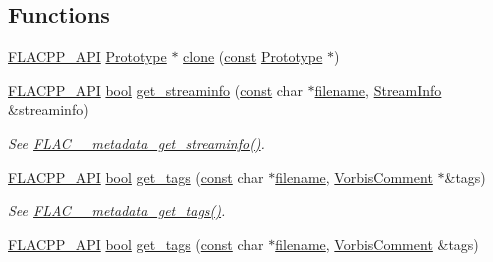 \subsection*{Functions}
\begin{DoxyCompactItemize}
\item 
\hyperlink{group__flacpp__export_gaec3a801bf18630403eda6dc2f8c4927a}{F\+L\+A\+C\+P\+P\+\_\+\+A\+PI} \hyperlink{class_f_l_a_c_1_1_metadata_1_1_prototype}{Prototype} $\ast$ \hyperlink{group__flacpp__metadata__object_gaea2484b59c72f4cce8366f25133f5d51}{clone} (\hyperlink{getopt1_8c_a2c212835823e3c54a8ab6d95c652660e}{const} \hyperlink{class_f_l_a_c_1_1_metadata_1_1_prototype}{Prototype} $\ast$)
\item 
\hyperlink{group__flacpp__export_gaec3a801bf18630403eda6dc2f8c4927a}{F\+L\+A\+C\+P\+P\+\_\+\+A\+PI} \hyperlink{mac_2config_2i386_2lib-src_2libsoxr_2soxr-config_8h_abb452686968e48b67397da5f97445f5b}{bool} \hyperlink{group__flacpp__metadata__level0_ga7dd10e98bdacabcff282c5bf3b29a34a}{get\+\_\+streaminfo} (\hyperlink{getopt1_8c_a2c212835823e3c54a8ab6d95c652660e}{const} char $\ast$\hyperlink{test__portburn_8cpp_a7efa5e9c7494c7d4586359300221aa5d}{filename}, \hyperlink{class_f_l_a_c_1_1_metadata_1_1_stream_info}{Stream\+Info} \&streaminfo)
\begin{DoxyCompactList}\small\item\em See \hyperlink{group__flac__metadata__level0_gaf248d1ccc8025b9e9d7f532b8af4ab07}{F\+L\+A\+C\+\_\+\+\_\+metadata\+\_\+get\+\_\+streaminfo()}. \end{DoxyCompactList}\item 
\hyperlink{group__flacpp__export_gaec3a801bf18630403eda6dc2f8c4927a}{F\+L\+A\+C\+P\+P\+\_\+\+A\+PI} \hyperlink{mac_2config_2i386_2lib-src_2libsoxr_2soxr-config_8h_abb452686968e48b67397da5f97445f5b}{bool} \hyperlink{group__flacpp__metadata__level0_gab9595fd6d76d734eb4010f5740f2509e}{get\+\_\+tags} (\hyperlink{getopt1_8c_a2c212835823e3c54a8ab6d95c652660e}{const} char $\ast$\hyperlink{test__portburn_8cpp_a7efa5e9c7494c7d4586359300221aa5d}{filename}, \hyperlink{class_f_l_a_c_1_1_metadata_1_1_vorbis_comment}{Vorbis\+Comment} $\ast$\&tags)
\begin{DoxyCompactList}\small\item\em See \hyperlink{group__flac__metadata__level0_gaf66469f31dca28837ffd3f8b0ec5c082}{F\+L\+A\+C\+\_\+\+\_\+metadata\+\_\+get\+\_\+tags()}. \end{DoxyCompactList}\item 
\hyperlink{group__flacpp__export_gaec3a801bf18630403eda6dc2f8c4927a}{F\+L\+A\+C\+P\+P\+\_\+\+A\+PI} \hyperlink{mac_2config_2i386_2lib-src_2libsoxr_2soxr-config_8h_abb452686968e48b67397da5f97445f5b}{bool} \hyperlink{group__flacpp__metadata__level0_gaae3e5fdfa4f866239d665c5b5cef6fe0}{get\+\_\+tags} (\hyperlink{getopt1_8c_a2c212835823e3c54a8ab6d95c652660e}{const} char $\ast$\hyperlink{test__portburn_8cpp_a7efa5e9c7494c7d4586359300221aa5d}{filename}, \hyperlink{class_f_l_a_c_1_1_metadata_1_1_vorbis_comment}{Vorbis\+Comment} \&tags)

\end{DoxyCompactItemize}
